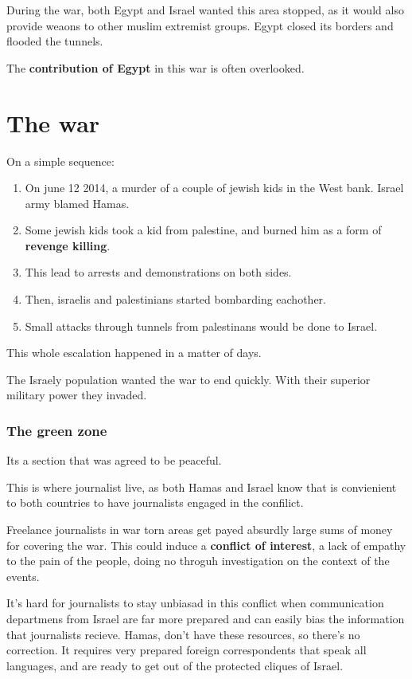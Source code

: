 During the war, both Egypt and Israel wanted this area stopped, as it would also provide weaons to other muslim extremist groups. Egypt closed its borders and flooded the tunnels.

The \textbf{contribution of Egypt} in this war is often overlooked.



\section{The war}

On a simple sequence:
\begin{enumerate}
	\item On june 12 2014, a murder of a couple of jewish kids in the West bank. Israel army blamed Hamas.
	\item Some jewish kids took a kid from palestine, and burned him as a form of \textbf{revenge killing}.
	\item This lead to arrests and demonstrations on both sides.
	\item Then, israelis and palestinians started bombarding eachother.
	\item Small attacks through tunnels from palestinans would be done to Israel.
\end{enumerate}

This whole escalation happened in a matter of days.

The Israely population wanted the war to end quickly. With their superior military power they invaded.


\subsubsection{The green zone} 

Its a section that was agreed to be peaceful.

This is where journalist live, as both Hamas and Israel know that is convienient to both countries to have journalists engaged in the confilict.

Freelance journalists in war torn areas get payed absurdly large sums of money for covering the war. This could induce a \textbf{conflict of interest}, a lack of empathy to the pain of the people, doing no throguh investigation on the context of the events.

It's hard for journalists to stay unbiasad in this conflict when communication departmens from Israel are far more prepared and can easily bias the information that journalists recieve. Hamas, don't have these resources, so there's no correction. It requires very prepared foreign correspondents that speak all languages, and are ready to get out of the protected cliques of Israel.


